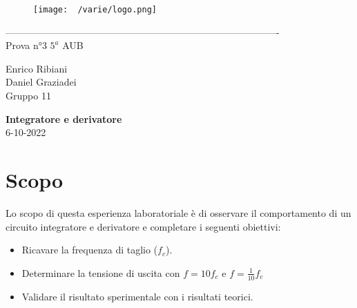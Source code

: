 \documentclass[12pt]{article}
\begin{document}
    \begin{titlepage}
    \begin{center}
\begin{figure}
    \centering
    \texttt{[image: ~/varie/logo.png]}
    \label{fig:logo}
\end{figure}
-------------------------------------------------------------------------------------\\
\vspace{2\baselineskip}
\large Prova n°3
\hfill
\large $5^a$   AUB\\
\begin{flushleft}
    \large Enrico Ribiani\\
    \large Daniel Graziadei\\
    \large Gruppo 11\\
\end{flushleft}


\vfill

\Huge{\textbf{Integratore e derivatore}}\\
\vfill
\vfill
\large{6-10-2022}
\end{center}
\end{titlepage}
\tableofcontents
\newpage
\vskip 1cm
\section{Scopo}
Lo scopo di questa esperienza laboratoriale è di osservare il comportamento di un circuito integratore 
e derivatore e completare i seguenti obiettivi:\\
\noindent
\begin{itemize}
    \item Ricavare la frequenza di taglio ($f_c$).
    \item Determinare la tensione di uscita con $f=10f_c$ e $f=\frac{1}{10}f_c$
    \item Validare il risultato sperimentale con i risultati teorici.
\end{itemize}
\end{document}
